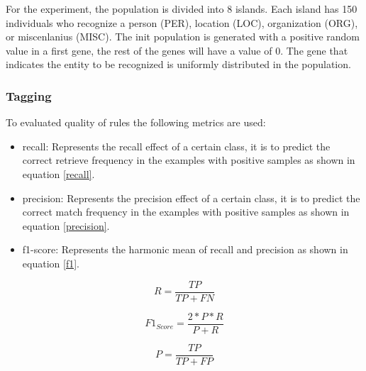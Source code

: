 

For the experiment, the population is divided into 8 islands. Each island has 150 individuals who recognize a person (PER), location (LOC), organization (ORG), or miscenlanius (MISC). The init population is generated with a positive random value in a first gene, the rest of the genes will have a value of 0. The gene that indicates the entity to be recognized is uniformly distributed in the population.

\subsubsection{Tagging}

To evaluated quality of rules the following metrics are used:
\begin{itemize}
  \item recall: Represents the recall effect of a certain class, it is to predict the correct retrieve frequency in the examples with positive samples as shown in equation \ref{recall}.
  \item precision: Represents the precision effect of a certain class, it is to predict the correct match frequency in the examples with positive samples as shown in equation \ref{precision}.
  \item f1-score: Represents the harmonic mean of recall and precision as shown in equation \ref{f1}.
\end{itemize}

\begin{equation}
  \label{recall}
  R = \frac{TP}{TP + FN}
\end{equation}

\begin{equation}
  \label{f1}
  F1_{Score} = \frac{2*P*R}{P + R}
\end{equation}

\begin{equation}
  \label{precision}
  P = \frac{TP}{TP + FP}
\end{equation}


